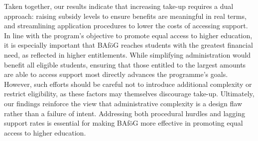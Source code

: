 Taken together, our results indicate that increasing take-up requires a dual approach: raising subsidy levels to ensure benefits are meaningful in real terms, and streamlining application procedures to lower the costs of accessing support. In line with the program's objective to promote equal access to higher education, it is especially important that BAföG reaches students with the greatest financial need, as reflected in higher entitlements. While simplifying administration would benefit all eligible students, ensuring that those entitled to the largest amounts are able to access support most directly advances the programme’s goals. However, such efforts should be careful not to introduce additional complexity or restrict eligibility, as these factors may themselves discourage take-up.
Ultimately, our findings reinforce the view that administrative complexity is a design flaw rather than a failure of intent. Addressing both procedural hurdles and lagging support rates is essential for making BAföG more effective in promoting equal access to higher education.
